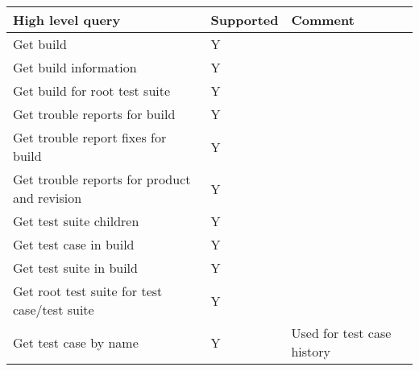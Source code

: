 \begin{table}[h]
\begin{tabular}{|l|l|l|}
\hline
\textbf{High level query}                & \textbf{Supported} & \textbf{Comment}           \\ \hline
Get build                                    & Y                                                                                        &                            \\ \hline
Get build information                        & Y                                                                                        &                            \\ \hline
Get build for root test suite                & Y                                                                                        &                            \\ \hline
Get trouble reports for build                & Y                                                                                        &                            \\ \hline
Get trouble report fixes for build           & Y                                                                                        &                            \\ \hline
Get trouble reports for product and revision & Y                                                                                        &                            \\ \hline
Get test suite children                      & Y                                                                                        &                            \\ \hline
Get test case in build                       & Y                                                                                        &                            \\ \hline
Get test suite in build                      & Y                                                                                        &                            \\ \hline
Get root test suite for test case/test suite & Y                                                                                        &                            \\ \hline
Get test case by name                        & Y                                                                                        & Used for test case history \\ \hline

\end{tabular}
\end{table}
